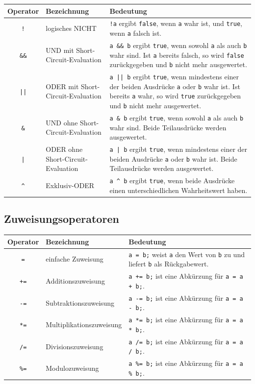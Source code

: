 \begin{tabularx}{\textwidth}{|c|p{3.4cm}|X|}\hline
\textbf{Operator} & \textbf{Bezeichnung} & \textbf{Bedeutung}
\\ \hline
\texttt{!} & logisches NICHT & \texttt{!a} ergibt \texttt{false},
wenn \texttt{a} wahr ist, und \texttt{true}, wenn \texttt{a}
falsch ist.
\\ \hline
\texttt{\&\&} & UND mit Short-Circuit-Evaluation &
\texttt{a \&\& b} ergibt \texttt{true}, wenn sowohl \texttt{a} als
auch \texttt{b} wahr sind. Ist \texttt{a} bereits falsch, so wird
\texttt{false} zurückgegeben und \texttt{b} nicht mehr ausgewertet.
\\ \hline
\texttt{||} & ODER mit Short-Circuit-Evaluation &
\texttt{a || b} ergibt \texttt{true}, wenn mindestens einer der beiden
Ausdrücke \texttt{a} oder \texttt{b} wahr ist. Ist bereits
\texttt{a} wahr, so wird \texttt{true} zurückgegeben und
\texttt{b} nicht mehr ausgewertet.
\\ \hline
\texttt{\&} & UND ohne Short-Circuit-Evaluation &
\texttt{a \& b} ergibt \texttt{true}, wenn sowohl \texttt{a} als
auch \texttt{b} wahr sind. Beide Teilausdrücke werden ausgewertet.
\\ \hline
\texttt{|} & ODER ohne Short-Circuit-Evaluation &
\texttt{a | b} ergibt \texttt{true}, wenn mindestens einer der beiden
Ausdrücke \texttt{a} oder \texttt{b} wahr ist. Beide
Teilausdrücke werden ausgewertet.
\\ \hline
\texttt{\^{}} & Exklusiv-ODER & \texttt{a \^{} b} ergibt \texttt{true},
wenn beide Ausdrücke einen unterschiedlichen Wahrheitswert haben.
\\ \hline
\end{tabularx}


\subsection{Zuweisungsoperatoren}

\begin{tabularx}{\textwidth}{|c|l|X|}\hline
\textbf{Operator} & \textbf{Bezeichnung} & \textbf{Bedeutung}
\\ \hline
\texttt{=} & einfache Zuweisung & \texttt{a = b;} weist
\texttt{a} den Wert von \texttt{b} zu und liefert \texttt{b} als
Rückgabewert.
\\ \hline
\texttt{+=} & Additionszuweisung & \texttt{a += b;} ist eine Abkürzung
für \texttt{a = a + b;}.
\\ \hline
\texttt{-=} & Subtraktionszuweisung & \texttt{a -= b;} ist eine
Abkürzung für \texttt{a = a - b;}.
\\ \hline
\texttt{*=} & Multiplikationszuweisung & \texttt{a *= b;} ist
eine Abkürzung für \texttt{a = a * b;}.
\\ \hline
\texttt{/=} & Divisionszuweisung & \texttt{a /= b;} ist
eine Abkürzung für \texttt{a = a / b;}.
\\ \hline
\texttt{\%=} & Modulozuweisung & \texttt{a \%= b;} ist eine Abkürzung
für \texttt{a = a \% b;}.
\\ \hline
\end{tabularx}


